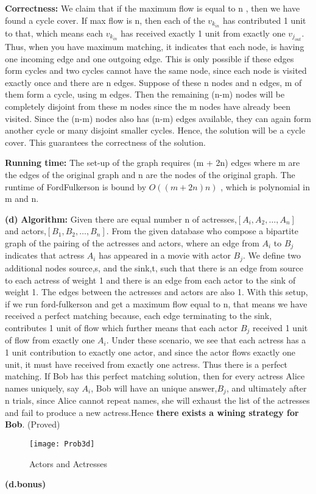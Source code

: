 \documentclass{article}
\renewcommand\part[1]{\vspace{.10in}\textbf{(#1)}}
\newcommand\algo{\vspace{.10in}\textbf{Algorithm: }}
\newcommand\correctness{\vspace{.10in}\textbf{Correctness: }}
\newcommand\runtime{\vspace{.10in}\textbf{Running time: }}
\begin{document}
  \correctness We claim that if the maximum flow is equal to n , then we have found a cycle cover. If max flow is n, then each of the $v_{k_{in}}$ has contributed 1 unit to that, which means each $v_{k_{in}}$ has received exactly 1 unit from exactly one $v_{j_{out}}$. Thus, when you have maximum matching, it indicates that each node, is having one incoming edge and one outgoing edge. This is only possible if these edges form cycles and two cycles cannot have the same node, since each node is visited exactly once and there are n edges. Suppose of these n nodes and n edges, m of them form a cycle, using m edges. Then the remaining (n-m) nodes will be completely disjoint from these m nodes since the m nodes have already been visited. Since the (n-m) nodes also has (n-m) edges available, they can again form another cycle or many disjoint smaller cycles. Hence, the solution will be a cycle cover. This guarantees the correctness of the solution. \newline

  \runtime 
  The set-up of the graph requires (m + 2n) edges where m are the edges of the original graph and n are the nodes of the original graph. The runtime of FordFulkerson is bound by $O((m+2n)n)$ , which is polynomial in m and n. \newline

  \part{d}
  \algo Given there are equal number n of actresses,$[A_i, A_2, \dots, A_n]$ and actors,$[B_1, B_2, \dots, B_n]$. From the given database who compose a bipartite graph of the pairing of the actresses and actors, where an edge from $A_i$ to $B_j$ indicates that actress $A_i$ has appeared in a movie with actor $B_j$. We define two additional nodes source,s, and the sink,t, such that there is an edge from source to each actress of weight 1 and there is an edge from each actor to the sink of weight 1. The edges between the actresses and actors are also 1. With this setup, if we run ford-fulkerson  and get a maximum flow equal to n, that means we have received a perfect matching because, each edge terminating to the sink, contributes 1 unit of flow which further means that each actor $B_j$ received 1 unit of flow from exactly one $A_i$. Under these scenario, we see that each actress has a 1 unit contribution to exactly one actor, and since the actor flows exactly one unit, it must have received from exactly one actress. Thus there is a perfect matching. If Bob has this perfect matching solution, then for every actress Alice names uniquely, say $A_i$, Bob will have an unique answer,$B_j$, and ultimately after n trials, since Alice cannot repeat names, she will exhaust the list of the actresses and fail to produce a new actress.Hence \textbf {there exists a wining strategy for Bob}. (Proved)\newline
 \begin{figure}[H]
   \centering
  \texttt{[image: Prob3d]}
  \caption{Actors and Actresses}
  \end{figure}

  \part{d.bonus}
   
 
\end{document}
